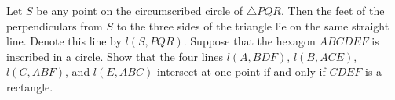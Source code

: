 Let $S$ be any point on the circumscribed circle of $\triangle PQR$. Then the feet of the perpendiculars from $S$ to the three sides of the triangle lie on the same straight line. Denote this line by $l(S, PQR)$. Suppose that the hexagon $ABCDEF$ is inscribed in a circle. Show that the four lines $l(A, BDF)$, $l(B, ACE)$, $l(C, ABF)$, and $l(E, ABC)$ intersect at one point if and only if $CDEF$ is a rectangle.
